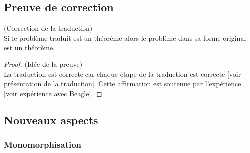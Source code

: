 \subsection{Preuve de correction}

\begin{thm}(Correction de la traduction)
\\Si le problème traduit est un théorème alors le problème dans sa forme original est un théorème.
\end{thm}

\begin{proof}(Idée de la preuve)
\\La traduction est correcte car chaque étape de la traduction est correcte [voir présentation de la traduction]. Cette affirmation est soutenue par l'expérience [voir expérience avec Beagle].
\end{proof}


\subsection{Nouveaux aspects}

\subsubsection{Monomorphisation}


